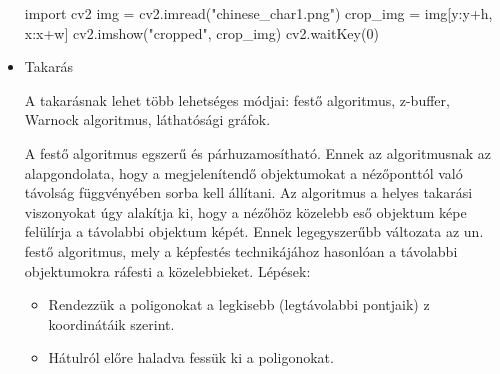 \begin{itemize}
\begin{python}
import cv2
img = cv2.imread("chinese_char1.png")
crop_img = img[y:y+h, x:x+w]
cv2.imshow("cropped", crop_img)
cv2.waitKey(0)
\end{python}

\item Takarás

A takarásnak lehet több lehetséges módjai: festő algoritmus, z-buffer, Warnock algoritmus, láthatósági gráfok.

A festő algoritmus egszerű és párhuzamosítható. Ennek az algoritmusnak az alapgondolata, hogy a megjelenítendő objektumokat a nézőponttól való távolság függvényében sorba kell állítani. Az algoritmus a helyes takarási viszonyokat úgy alakítja ki, hogy a nézőhöz közelebb eső objektum képe felülírja a távolabbi objektum képét. Ennek legegyszerűbb változata az un. festő algoritmus, mely a képfestés technikájához hasonlóan a távolabbi objektumokra ráfesti a közelebbieket.
Lépések:
\begin{itemize}
\item Rendezzük a poligonokat a legkisebb (legtávolabbi pontjaik) z koordinátáik szerint.
\item Hátulról előre haladva fessük ki a poligonokat. 
\end{itemize}

\end{itemize}